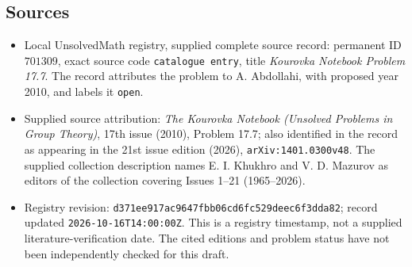 \documentclass[11pt]{article}
\begin{document}
\subsection{Sources}
\begin{itemize}
\item Local UnsolvedMath registry, supplied complete source record: permanent ID \(701309\), exact source code \texttt{catalogue entry}, title \emph{Kourovka Notebook Problem 17.7}. The record attributes the problem to A. Abdollahi, with proposed year 2010, and labels it \texttt{open}.
\item Supplied source attribution: \emph{The Kourovka Notebook (Unsolved Problems in Group Theory)}, 17th issue (2010), Problem 17.7; also identified in the record as appearing in the 21st issue edition (2026), \texttt{arXiv:1401.0300v48}. The supplied collection description names E. I. Khukhro and V. D. Mazurov as editors of the collection covering Issues 1--21 (1965--2026).
\item Registry revision: \texttt{d371ee917ac9647fbb06cd6fc529deec6f3dda82}; record updated \texttt{2026-10-16T14:00:00Z}. This is a registry timestamp, not a supplied literature-verification date. The cited editions and problem status have not been independently checked for this draft.
\end{itemize}
\end{document}
